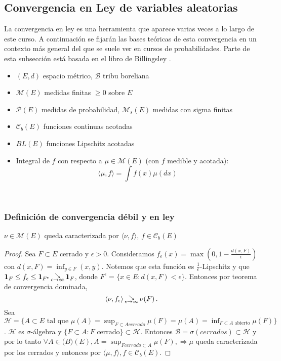 \subsection{Convergencia en Ley de variables aleatorias}
La convergencia en ley es una herramienta que aparece varias veces a lo largo de este curso. A continuación se fijarán las bases teóricas de esta convergencia en un contexto más general del que se suele ver en cursos de probabilidades.
Parte de esta subsección está basada en el libro de Billingsley \cite{billing}.
\begin{notation}
\beforeitemize
\begin{itemize}
    \item $(E,d)$ espacio métrico, $\mathcal{B}$ tribu boreliana
    \item $\mathcal{M}(E)$ medidas finitas $\geq0$ sobre $E$
    \item $\mathcal{P}(E)$ medidas de probabilidad, $\mathcal{M}_s(E)$ medidas con sigma finitas %
    \item $\mathcal{C}_b(E)$ funciones continuas acotadas %
    \item $BL(E)$ funciones Lipschitz acotadas
    \item Integral de $f$ con respecto a $\mu \in \mathcal{M}(E)$ (con $f$ medible y acotada): $$ \langle \mu, f \rangle = \int f(x)\mu(dx) $$
\end{itemize}
\end{notation}


\vspace{2cm}\\
\subsubsection{Definición de convergencia débil y en ley}
\begin{remark}
$\nu \in \mathcal{M}(E)$ queda caracterizada por $\langle \nu,f \rangle$, $f \in \mathcal{C}_b(E)$
\end{remark}
\begin{proof}\gris Sea $F\subset E$ cerrado y $\epsilon>0$. Consideramos $f_\epsilon(x) = \max (0,1-\frac{d(x,F)}{\epsilon})$ con $d(x,F)=\displaystyle\inf_{y\in F}(x,y)$. Notemos que esta función es $\frac{1}{\epsilon}$-Lipschitz y que $\mathbf{1}_F\leq f_\epsilon\leq\mathbf{1}_{F^\epsilon}\,\substack{\searrow \\ \tiny{\epsilon\to\infty}}\,\mathbf{1}_F$, donde $F^\epsilon = \{x \in E : d(x,F)<\epsilon\}$. Entonces por teorema de convergencia dominada, 
$$ \langle \nu,f_\epsilon \rangle \,\substack{\searrow \\ \tiny{\epsilon\to\infty}}\, \nu(F) \, . $$
Sea $\displaystyle\mathcal{H}=\{A\subset E \mbox{ tal que }\mu(A)=\sup_{F\subset A cerrado}\mu(F)=\mu(A)=\inf_{F\subset A\mbox{ abierto}}\mu(F)\}$. $\mathcal{H}$ es $\sigma$-álgebra y $\{F\subset A : F\mbox{ cerrado}\}\subset\mathcal{H}$. Entonces $\mathcal{B}=\sigma(cerrados)\subset\mathcal{H}$ y por lo tanto $\displaystyle\forall A\in\mathcal(B)(E),A=\sup_{F cerrado \subset A}\mu(F),\Rightarrow \mu$ queda caracterizada por los cerrados y entonces por $\langle \mu,f \rangle, f\in\mathcal{C}_b(E)$. 
\negro \findem
\end{proof}

